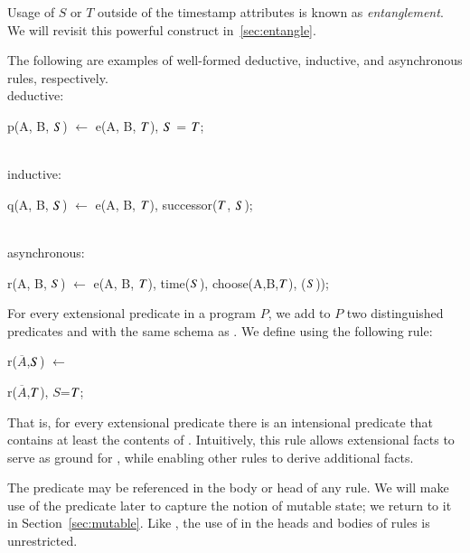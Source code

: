 Usage of $S$ or $T$ outside of the timestamp attributes is known as {\em entanglement}.  We will revisit this powerful construct in~\ref{sec:entangle}. 

\begin{example}
The following are examples of well-formed deductive, inductive, and asynchronous rules, respectively.
\\
deductive:
\begin{Dedalus}
p(A, B, \(\DS\)) \(\leftarrow\) e(A, B, \(\DT\)), \(\DS\) = \(\DT\);
\end{Dedalus}
\\
inductive:
\begin{Dedalus}
q(A, B, \(\DS\)) \(\leftarrow\) e(A, B, \(\DT\)), successor(\(\DT\), \(\DS\));
\end{Dedalus}
\\
asynchronous:
\begin{Dedalus}
r(A, B, \(\DS\)) \(\leftarrow\) e(A, B, \(\DT\)), time(\(\DS\)),
   choose(A,B,\(\DT\)), (\(\DS\)));
\end{Dedalus}
\end{example}

For every extensional predicate  in a \lang program $P$, we add to
$P$ two distinguished predicates  and  with the same schema
as .  We define  using the following rule:

\begin{dedalus}
r\pos($\overline{A}$,\(\DS\)) \(\leftarrow\)
\end{dedalus}

\hspace{5mm}
\begin{dedalus}
   r($\overline{A}$,\(\DT\)), \(S\)=\(\DT\);
\end{dedalus}

That is, for every extensional predicate  there is an intensional
predicate  that contains at least the contents of .
Intuitively, this rule allows extensional facts to serve as ground for
, while enabling other rules to derive additional  facts.

The predicate  may be referenced in the body or head of any \lang rule.  
We will make use of the predicate  later to capture the notion of mutable state; we return to it in Section~\ref{sec:mutable}. 
Like , the use of  in the heads and bodies of rules is unrestricted.

